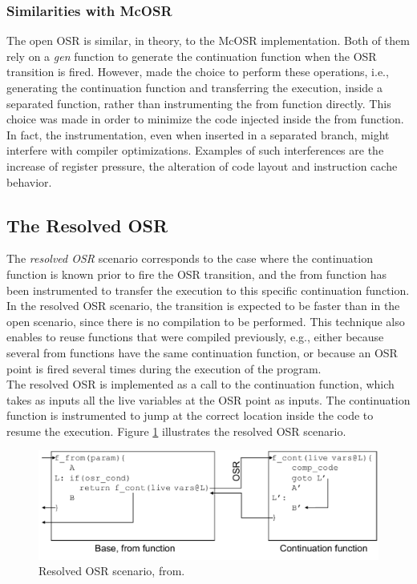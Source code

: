 \subsubsection{Similarities with McOSR}
The open OSR is similar, in theory, to the McOSR implementation\cite{lameed2013modular}.
Both of them rely on a \textit{gen} function to generate the continuation function when the OSR transition is fired.
However,  made the choice to perform these operations, i.e., generating the continuation function and transferring the execution, inside a separated function, rather than instrumenting the from function directly.
This choice was made in order to minimize the code injected inside the from function.
In fact, the instrumentation, even when inserted in a separated branch, might interfere with compiler optimizations.
Examples of such interferences are the increase of register pressure, the alteration of code layout and instruction cache behavior.\\

\subsection{The Resolved OSR}

The \textit{resolved OSR} scenario corresponds to the case where the continuation function is known prior to fire the OSR transition, and the from function has been instrumented to transfer the execution to this specific continuation function.
In the resolved OSR scenario, the transition is expected to be faster than in the open scenario, since there is no compilation to be performed. 
This technique also enables to reuse functions that were compiled previously, e.g., either because several from functions have the same continuation function, or because an OSR point is fired several times during the execution of the program.\\

The resolved OSR is implemented as a call to the continuation function, which takes as inputs all the live variables at the OSR point as inputs.
The continuation function is instrumented to jump at the correct location inside the code to resume the execution. 
Figure \ref{ResolvedOSRFig} illustrates the resolved OSR scenario.\\

\begin{figure}[h]
\centering
\includegraphics[scale=0.5]{Figures/OSRKitResolvedScenario}
\decoRule
\caption[Resolved OSR Scenario]{Resolved OSR scenario, from\cite{OSRKit}.}
\label{ResolvedOSRFig}
\end{figure}

